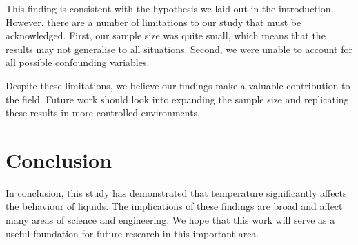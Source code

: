 \documentclass{article}
\begin{document}
This finding is consistent with the hypothesis we laid out in the introduction. However,
there are a number of limitations to our study that must be acknowledged. First, our sample
size was quite small, which means that the results may not generalise to all situations.
Second, we were unable to account for all possible confounding variables.

Despite these limitations, we believe our findings make a valuable contribution to the
field. Future work should look into expanding the sample size and replicating these
results in more controlled environments.

\section{Conclusion}

In conclusion, this study has demonstrated that temperature significantly affects the
behaviour of liquids. The implications of these findings are broad and affect many areas
of science and engineering. We hope that this work will serve as a useful foundation
for future research in this important area.



\end{document}
